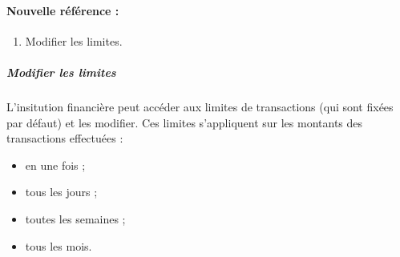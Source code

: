 \paragraph{Nouvelle référence :}
\begin{enumerate}
\item Modifier les limites.
\end{enumerate}


\subparagraph{Modifier les limites} L'insitution financière peut accéder aux limites de transactions (qui sont fixées par défaut) et les modifier. Ces limites s'appliquent sur les montants des transactions effectuées :
\begin{itemize}
\item en une fois ;
\item tous les jours ;
\item toutes les semaines ;
\item tous les mois.
\end{itemize}